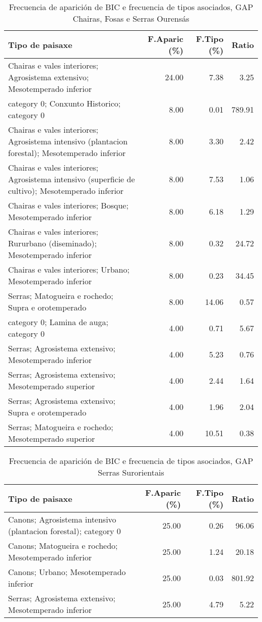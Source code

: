 \begin{table}[p]
\centering
\caption{Frecuencia de aparición de BIC e frecuencia de tipos asociados, GAP Chairas, Fosas e Serras Ourensás} 
\label{vbic8}
\begin{tabular}{lrrr}
  \hline
Tipo de paisaxe & F.Aparic (\%) & F.Tipo (\%) & Ratio \\ 
  \hline
Chairas e vales interiores; Agrosistema extensivo; Mesotemperado inferior & 24.00 & 7.38 & 3.25 \\ 
  category 0; Conxunto Historico; category 0 & 8.00 & 0.01 & 789.91 \\ 
  Chairas e vales interiores; Agrosistema intensivo (plantacion forestal); Mesotemperado inferior & 8.00 & 3.30 & 2.42 \\ 
  Chairas e vales interiores; Agrosistema intensivo (superficie de cultivo); Mesotemperado inferior & 8.00 & 7.53 & 1.06 \\ 
  Chairas e vales interiores; Bosque; Mesotemperado inferior & 8.00 & 6.18 & 1.29 \\ 
  Chairas e vales interiores; Rururbano (diseminado); Mesotemperado inferior & 8.00 & 0.32 & 24.72 \\ 
  Chairas e vales interiores; Urbano; Mesotemperado inferior & 8.00 & 0.23 & 34.45 \\ 
  Serras; Matogueira e rochedo; Supra e orotemperado & 8.00 & 14.06 & 0.57 \\ 
  category 0; Lamina de auga; category 0 & 4.00 & 0.71 & 5.67 \\ 
  Serras; Agrosistema extensivo; Mesotemperado inferior & 4.00 & 5.23 & 0.76 \\ 
  Serras; Agrosistema extensivo; Mesotemperado superior & 4.00 & 2.44 & 1.64 \\ 
  Serras; Agrosistema extensivo; Supra e orotemperado & 4.00 & 1.96 & 2.04 \\ 
  Serras; Matogueira e rochedo; Mesotemperado superior & 4.00 & 10.51 & 0.38 \\ 
   \hline
\end{tabular}
\end{table}
\begin{table}[p]
\centering
\caption{Frecuencia de aparición de BIC e frecuencia de tipos asociados, GAP Serras Surorientais} 
\label{vbic9}
\begin{tabular}{lrrr}
  \hline
Tipo de paisaxe & F.Aparic (\%) & F.Tipo (\%) & Ratio \\ 
  \hline
Canons; Agrosistema intensivo (plantacion forestal); category 0 & 25.00 & 0.26 & 96.06 \\ 
  Canons; Matogueira e rochedo; Mesotemperado inferior & 25.00 & 1.24 & 20.18 \\ 
  Canons; Urbano; Mesotemperado inferior & 25.00 & 0.03 & 801.92 \\ 
  Serras; Agrosistema extensivo; Mesotemperado inferior & 25.00 & 4.79 & 5.22 \\ 
   \hline
\end{tabular}
\end{table}
